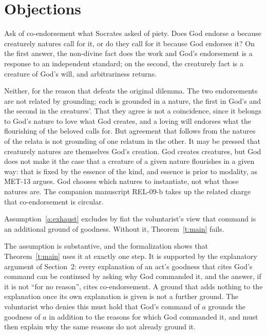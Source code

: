 \documentclass{situationist-preprint}
\begin{document}
\section{Objections}

\begin{objection}
Ask of co-endorsement what Socrates asked of piety. Does God endorse $a$ because creaturely natures call for it, or do they call for it because God endorses it? On the first answer, the non-divine fact does the work and God's endorsement is a response to an independent standard; on the second, the creaturely fact is a creature of God's will, and arbitrariness returns.
\end{objection}

\begin{reply}
Neither, for the reason that defeats the original dilemma. The two endorsements are not related by grounding; each is grounded in a nature, the first in God's and the second in the creatures'. That they agree is not a coincidence, since it belongs to God's nature to love what God creates, and a loving will endorses what the flourishing of the beloved calls for. But agreement that follows from the natures of the relata is not grounding of one relatum in the other. It may be pressed that creaturely natures are themselves God's creation. God creates creatures, but God does not make it the case that a creature of a given nature flourishes in a given way: that is fixed by the essence of the kind, and essence is prior to modality, as MET-13 argues. God chooses which natures to instantiate, not what those natures are. The companion manuscript REL-09-b takes up the related charge that co-endorsement is circular.
\end{reply}

\begin{objection}
Assumption~\ref{a:exhaust} excludes by fiat the voluntarist's view that command is an additional ground of goodness. Without it, Theorem~\ref{t:main} fails.
\end{objection}

\begin{reply}
The assumption is substantive, and the formalization shows that Theorem~\ref{t:main} uses it at exactly one step. It is supported by the explanatory argument of Section~2: every explanation of an act's goodness that cites God's command can be continued by asking why God commanded it, and the answer, if it is not \enquote{for no reason}, cites co-endorsement. A ground that adds nothing to the explanation once its own explanation is given is not a further ground. The voluntarist who denies this must hold that God's command of $a$ grounds the goodness of $a$ in addition to the reasons for which God commanded it, and must then explain why the same reasons do not already ground it.
\end{reply}
\end{document}
